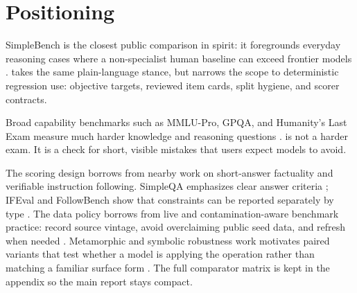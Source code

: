 \section{Positioning}

SimpleBench is the closest public comparison in spirit: it foregrounds everyday
reasoning cases where a non-specialist human baseline can exceed frontier
models \citep{simplebench}. \benchmarkname{} takes the same plain-language
stance, but narrows the scope to deterministic regression use: objective
targets, reviewed item cards, split hygiene, and scorer contracts.

Broad capability benchmarks such as MMLU-Pro, GPQA, and Humanity's Last Exam
measure much harder knowledge and reasoning questions
\citep{wang2024mmlupro,rein2023gpqa,phan2026hle}. \benchmarkname{} is not a
harder exam. It is a check for short, visible mistakes that users expect models
to avoid.

The scoring design borrows from nearby work on short-answer factuality and
verifiable instruction following. SimpleQA emphasizes clear answer criteria
\citep{wei2024simpleqa}; IFEval and FollowBench show that constraints can be
reported separately by type \citep{zhou2023ifeval,jiang2024followbench}. The
data policy borrows from live and contamination-aware benchmark practice:
record source vintage, avoid overclaiming public seed data, and refresh when
needed \citep{white2025livebench,jain2024livecodebench,jiang2025benchmarkaging}.
Metamorphic and symbolic robustness work motivates paired variants that test
whether a model is applying the operation rather than matching a familiar
surface form \citep{mirzadeh2025gsmsymbolic}.
The full comparator matrix is kept in the appendix so the main report stays
compact.
